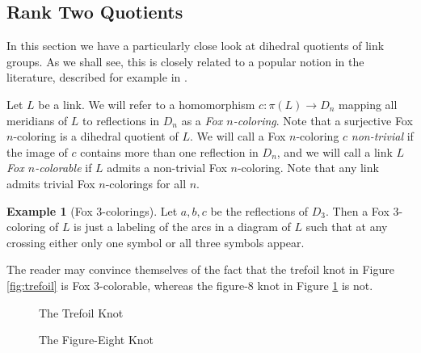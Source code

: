 \documentclass{article}
\theoremstyle{definition}
\newtheorem{example}[theorem]{Example}
\begin{document}
\subsection{Rank Two Quotients}\label{subsec:rank-two}
In this section we have a particularly close look at dihedral quotients of link groups. As we shall see, this is closely related to a popular notion in the literature, described for example in \cite{przytycki1998}. 

Let $L$ be a link. We will refer to a homomorphism $c: \pi(L) \rightarrow D_n$ mapping all meridians of $L$ to reflections in $D_n$ as a \textit{Fox $n$-coloring}. Note that a surjective Fox $n$-coloring is a dihedral quotient of $L$. We will call a Fox $n$-coloring $c$ \textit{non-trivial} if the image of $c$ contains more than one reflection in $D_n$, and we will call a link $L$ \textit{Fox $n$-colorable} if $L$ admits a non-trivial Fox $n$-coloring. Note that any link admits trivial Fox $n$-colorings for all $n$.

\begin{example}[Fox $3$-colorings]
Let $a, b, c$ be the reflections of $D_3$. Then a Fox $3$-coloring of $L$ is just a labeling of the arcs in a diagram of $L$ such that at any crossing either only one symbol or all three symbols appear.

The reader may convince themselves of the fact that the trefoil knot in Figure \ref{fig:trefoil} is Fox $3$-colorable, whereas the figure-8 knot in Figure \ref{fig:figure-8} is not.

\begin{figure}[ht]
\centering
\begin{minipage}{0.5\textwidth}
 \centering
{}
\caption{The Trefoil Knot}
\label{fig:trefoil}
\end{minipage}%
\begin{minipage}{0.5\textwidth}
\centering
{}
\caption{The Figure-Eight Knot}
\label{fig:figure-8}
\end{minipage}
\end{figure}
\end{example}
\end{document}
